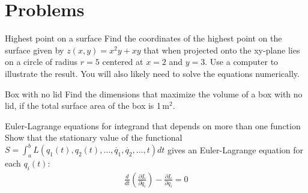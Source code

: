 %
\section{Problems}
\begin{problem}{Highest point on a surface} Find the coordinates of the highest point on the surface given by $z(x,y)=x^2y+xy$ that when projected onto the xy-plane lies on a circle of radius $r=5$ centered at $x=2$ and $y=3$. Use a computer to illustrate the result. You will also likely need to solve the equations numerically.
\label{prob_CalcVar_1}
\end{problem}
\begin{problem}{Box with no lid} Find the dimensions that maximize the volume of a box with no lid, if the total surface area of the box is 1\,m$^2$.
\label{prob_CalcVar_2}
\end{problem}
%
%
%

\begin{problem}{Euler-Lagrange equations for integrand that depends on more than one function}\label{prob_CalcVar_3} Show that the stationary value of the functional $S=\int_a^b L(q_1(t),q_2(t),\dots,\dot{q_1}, \dot{q_2},\dots,t)dt$ gives an Euler-Lagrange equation for each $q_i(t)$:
\begin{align*}
\frac{d}{dt}\left(\frac{\partial L}{\partial \dot{q_i}}\right)-\frac{\partial L}{\partial q_i}=0
\end{align*}
\end{problem}

